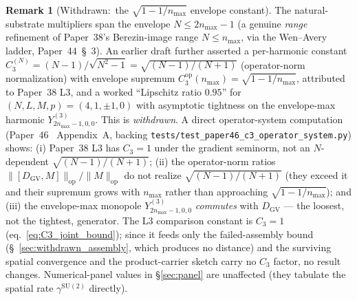 \documentclass[11pt,a4paper]{article}
\theoremstyle{plain}
\theoremstyle{definition}
\newtheorem{remark}[theorem]{Remark}
\newcommand{\nmax}{n_{\max}}
\newcommand{\opnorm}[1]{\lVert #1 \rVert_{\mathrm{op}}}
\newcommand{\SU}{\mathrm{SU}}
\newcommand{\DGV}{D_{\mathrm{GV}}}
\newcommand{\gammaSU}{\gamma^{\SU(2)}}
\begin{document}
\begin{remark}[Withdrawn:\ the $\sqrt{1 - 1/\nmax}$ envelope constant]\label{rem:envelope_v2}
The natural-substrate multipliers span the envelope $N \le 2\nmax - 1$
(a genuine \emph{range} refinement of Paper~38's Berezin-image range
$N \le \nmax$, via the Wen--Avery ladder, Paper~44~\S~3). An
earlier draft further asserted a per-harmonic constant
$C_3^{(N)} = (N-1)/\sqrt{N^{2}-1} = \sqrt{(N-1)/(N+1)}$ (operator-norm
normalization) with envelope supremum
$C_{3}^{\mathrm{op}}(\nmax) = \sqrt{1 - 1/\nmax}$, attributed to Paper~38 L3, and a
worked ``Lipschitz ratio $0.95$'' for $(N,L,M,p) = (4,1,\pm1,0)$ with
asymptotic tightness on the envelope-max harmonic $Y^{(3)}_{2\nmax-1,0,0}$.
This is \emph{withdrawn}. A direct operator-system computation
(Paper~46~\cite{paper46} Appendix~A, backing
\texttt{tests/test\_paper46\_c3\_operator\_system.py}) shows: (i) Paper~38 L3
has $C_{3} = 1$ under the gradient seminorm, not an $N$-dependent
$\sqrt{(N-1)/(N+1)}$; (ii) the operator-norm ratios
$\opnorm{[\DGV, M]}/\opnorm{M}$ do not realize $\sqrt{(N-1)/(N+1)}$ (they
exceed it and their supremum grows with $\nmax$ rather than approaching
$\sqrt{1-1/\nmax}$); and (iii) the envelope-max monopole
$Y^{(3)}_{2\nmax-1,0,0}$ \emph{commutes} with $\DGV$ — the loosest, not the
tightest, generator. The L3 comparison constant is $C_{3} = 1$
(eq.~\ref{eq:C3_joint_bound}); since it feeds only the failed-assembly bound
(\S~\ref{sec:withdrawn_assembly}, which produces no distance) and the
surviving spatial convergence and the product-carrier sketch carry no $C_{3}$ factor,
no result changes. Numerical-panel values in \S\ref{sec:panel} are
unaffected (they tabulate the spatial rate $\gammaSU$ directly).
\end{remark}
\end{document}
